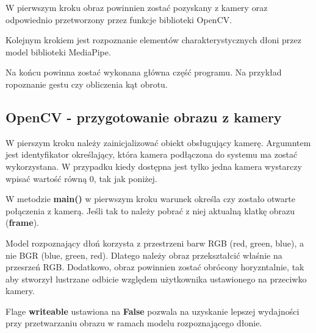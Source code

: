 \quad W pierwszym kroku obraz powinnien zostać pozyskany z kamery oraz odpowiednio przetworzony przez funkcje biblioteki OpenCV. 

\quad Kolejnym krokiem jest rozpoznanie elementów charakterystycznych dłoni przez model biblioteki MediaPipe. 

\quad Na końcu powinna zostać wykonana główna część programu. Na przykład ropoznanie gestu czy obliczenia kąt obrotu. 

\subsection{OpenCV - przygotowanie obrazu z kamery}

\quad W pierszym kroku należy zainicjalizować obiekt obsługujący kamerę. Argumntem jest identyfikator określający, która kamera podłączona do systemu ma zostać wykorzystana. W przypadku kiedy dostępna jest tylko jedna kamera wystarczy wpisać wartość równą 0, tak jak poniżej.  




\quad W metodzie \textbf{main()} w pierwszym kroku warunek określa czy zostało otwarte połączenia z kamerą. Jeśli tak to należy pobrać z niej aktualną klatkę obrazu (\textbf{frame}). 



\quad Model rozpoznający dłoń korzysta z przestrzeni barw RGB (red, green, blue), a nie BGR (blue, green, red). Dlatego należy obraz przekształcić właśnie na przesrzeń RGB. Dodatkowo, obraz powinnien zostać obrócony horyzntalnie, tak aby stworzył lustrzane odbicie względem użytkownika ustawionego na przeciwko kamery. 



\quad Flage \textbf{writeable} ustawiona na \textbf{False} pozwala na uzyskanie lepszej wydajności przy przetwarzaniu obrazu w ramach modelu rozpoznającego dłonie. 



